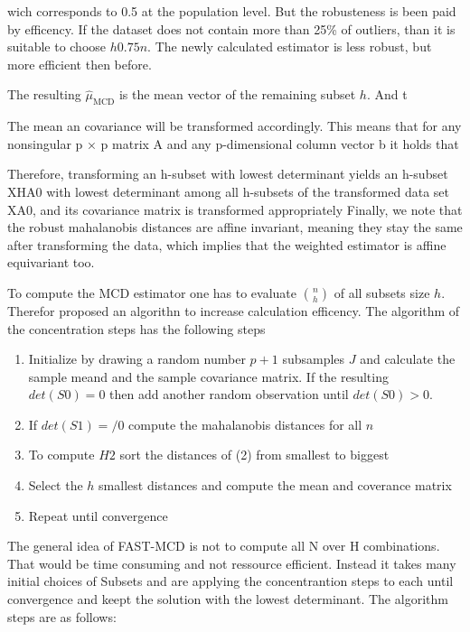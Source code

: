 wich corresponds to 0.5 at the population level. But the robusteness is been paid by efficency. 
If the dataset does not contain more than 25\% of outliers, than it is suitable to choose $h  0.75n$. \citep[p.217]{rousseeuw1999fast}
The newly calculated estimator is less robust, but more efficient then before. 

The resulting $\hat{\mu}_{\text{MCD}}$ is the mean vector of the remaining subset $h$. 
And t


The mean an covariance will be transformed accordingly.
This means that for any nonsingular p × p matrix A and
any p-dimensional column vector b it holds that

Therefore, transforming an h-subset with lowest determinant yields an h-subset XHA0 with lowest determinant among all
h-subsets of the transformed data set XA0, and its covariance matrix is transformed appropriately
Finally, we note that the robust mahalanobis distances are affine invariant, meaning they stay the same after transforming the data, which implies that the weighted
estimator is affine equivariant too.

To compute the MCD estimator one has to evaluate $\binom{n}{h}$ of all subsets size $h$.
Therefor \citet{rousseeuw1999fast} proposed an algorithn to increase calculation efficency. 
The algorithm of the concentration steps has the following steps \citep[p.214]{rousseeuw1999fast} 

\begin{enumerate}
    \item Initialize by drawing a random number $p+1$ subsamples $J$ and calculate the sample meand and the sample covariance matrix. If the resulting $det(S0)=0$ then add another random observation until $det(S0)>0$.
    \item If $det(S1)=/0$ compute the mahalanobis distances for all $n$
    \item To compute $H2$ sort the distances of (2) from smallest to biggest
    \item Select the $h$ smallest distances and compute the mean and coverance matrix
    \item Repeat until convergence
\end{enumerate}


The general idea of FAST-MCD is not to compute all N over H combinations. That would be time consuming and not ressource efficient.
Instead it takes many initial choices of Subsets and are applying the concentrantion steps to each until convergence and keept the solution 
with the lowest determinant.
The algorithm steps are as follows:

